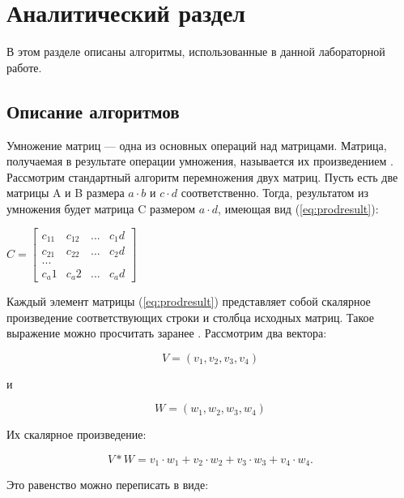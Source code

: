 \documentclass[12pt,a4paper]{scrartcl}
\begin{document}
    \newpage
	\section{Аналитический раздел}
	\label{sec:analitics}
	
	В этом разделе описаны алгоритмы, использованные в данной лабораторной работе.
	\subsection{Описание алгоритмов}
	\label{sec:analitics:alg}
	
	Умножение матриц — одна из основных операций над матрицами.
	Матрица, получаемая в результате операции умножения, называется их произведением \cite{Matrix_Mult}. 
	Рассмотрим стандартный алгоритм перемножения двух матриц.
	Пусть есть две матрицы A и B размера $a\cdot b$ и $c\cdot d$ соответственно. 
	Тогда, результатом из умножения будет матрица C размером $a\cdot d$, имеющая вид (\ref{eq:prodresult}):
	
	\begin{math}\label{eq:prodresult}
	C =\begin{bmatrix}
	c_11 & c_12 & ... & c_1d\\
	c_21 & c_22 & ... & c_2d\\
	...\\
	c_a1 & c_a2 & ... & c_ad
	\end{bmatrix}
	\end{math}
	
	Каждый элемент матрицы (\ref{eq:prodresult}) представляет собой скалярное произведение соответствующих строки и столбца исходных матриц. 
	Такое выражение можно просчитать заранее \cite{Coppersmith_Winograd}. 
	Рассмотрим два вектора: 
	
	\begin{equation}\label{eq:vector1}
	V = (v_1, v_2, v_3, v_4)
	\end{equation}
	
	и
	
	\begin{equation}\label{eq:vector2}
	W = (w_1, w_2, w_3, w_4)
	\end{equation}
	
	
	Их скалярное произведение: 
	
	\begin{equation}\label{eq:scalar1}
	V * W = v_1 \cdot w_1 + v_2 \cdot w_2 + v_3 \cdot w_3 + v_4 \cdot w_4.
	\end{equation}
	
	
	Это равенство можно переписать в виде: 
	
\end{document}
